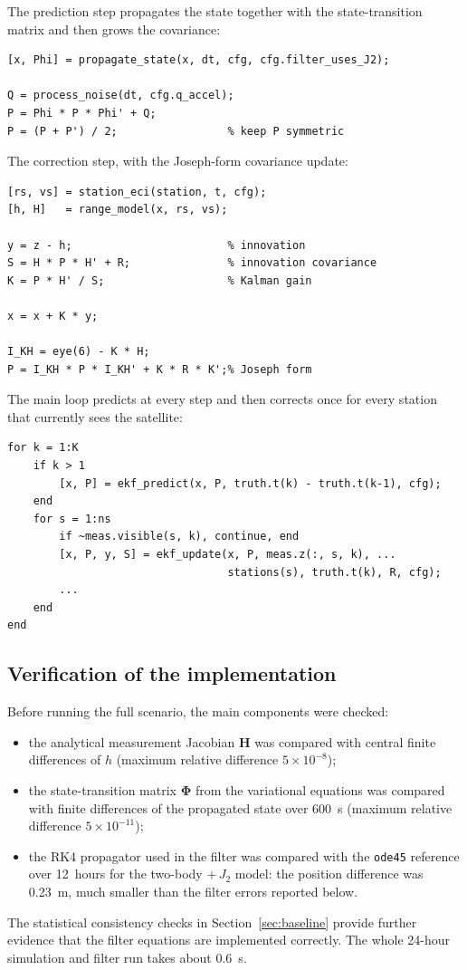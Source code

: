 \documentclass[11pt,a4paper]{article}
\newcommand{\bH}{\mathbf{H}}
\begin{document}
The prediction step propagates the state together with the state-transition matrix and then grows the covariance:
\begin{lstlisting}
[x, Phi] = propagate_state(x, dt, cfg, cfg.filter_uses_J2);

Q = process_noise(dt, cfg.q_accel);
P = Phi * P * Phi' + Q;
P = (P + P') / 2;                 % keep P symmetric
\end{lstlisting}

The correction step, with the Joseph-form covariance update:
\begin{lstlisting}
[rs, vs] = station_eci(station, t, cfg);
[h, H]   = range_model(x, rs, vs);

y = z - h;                        % innovation
S = H * P * H' + R;               % innovation covariance
K = P * H' / S;                   % Kalman gain

x = x + K * y;

I_KH = eye(6) - K * H;
P = I_KH * P * I_KH' + K * R * K';% Joseph form
\end{lstlisting}

The main loop predicts at every step and then corrects once for every station that currently sees the satellite:
\begin{lstlisting}
for k = 1:K
    if k > 1
        [x, P] = ekf_predict(x, P, truth.t(k) - truth.t(k-1), cfg);
    end
    for s = 1:ns
        if ~meas.visible(s, k), continue, end
        [x, P, y, S] = ekf_update(x, P, meas.z(:, s, k), ...
                                  stations(s), truth.t(k), R, cfg);
        ...
    end
end
\end{lstlisting}

\subsection{Verification of the implementation}
Before running the full scenario, the main components were checked:
\begin{itemize}
  \item the analytical measurement Jacobian $\bH$ was compared with central finite differences of $h$ (maximum relative difference $5\times10^{-8}$);
  \item the state-transition matrix $\boldsymbol\Phi$ from the variational equations was compared with finite differences of the propagated state over 600~s (maximum relative difference $5\times10^{-11}$);
  \item the RK4 propagator used in the filter was compared with the \texttt{ode45} reference over 12~hours for the two-body $+\,J_2$ model: the position difference was 0.23~m, much smaller than the filter errors reported below.
\end{itemize}
The statistical consistency checks in Section~\ref{sec:baseline} provide further evidence that the filter equations are implemented correctly.
The whole 24-hour simulation and filter run takes about 0.6~s.
\end{document}
